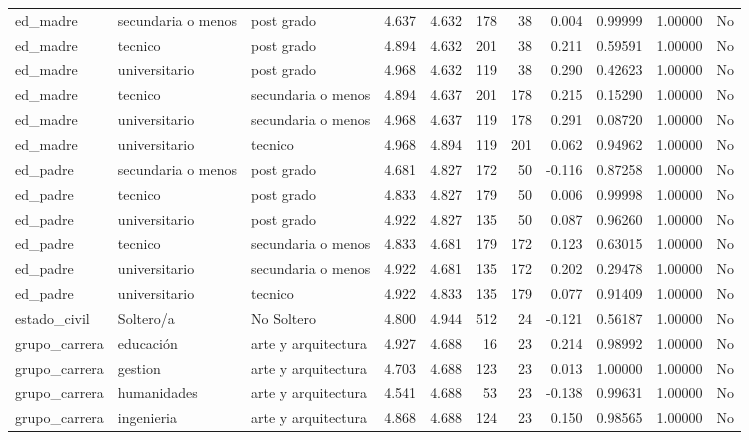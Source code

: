\documentclass[
  letterpaper,
  DIV=11,
  numbers=noendperiod]{scrartcl}
\begin{document}
\begin{table}
\begin{tabular*}{\linewidth}{@{\extracolsep{\fill}}lllrrrrrrrl}
\midrule\addlinespace[2.5pt]
\multicolumn{11}{l}{soporte\_social} \\[2.5pt] 
\midrule\addlinespace[2.5pt]
ed\_madre & secundaria o menos & post grado & 4.637 & 4.632 & 178 & 38 & 0.004 & 0.99999 & 1.00000 & No \\ 
ed\_madre & tecnico & post grado & 4.894 & 4.632 & 201 & 38 & 0.211 & 0.59591 & 1.00000 & No \\ 
ed\_madre & universitario & post grado & 4.968 & 4.632 & 119 & 38 & 0.290 & 0.42623 & 1.00000 & No \\ 
ed\_madre & tecnico & secundaria o menos & 4.894 & 4.637 & 201 & 178 & 0.215 & 0.15290 & 1.00000 & No \\ 
ed\_madre & universitario & secundaria o menos & 4.968 & 4.637 & 119 & 178 & 0.291 & 0.08720 & 1.00000 & No \\ 
ed\_madre & universitario & tecnico & 4.968 & 4.894 & 119 & 201 & 0.062 & 0.94962 & 1.00000 & No \\ 
ed\_padre & secundaria o menos & post grado & 4.681 & 4.827 & 172 & 50 & -0.116 & 0.87258 & 1.00000 & No \\ 
ed\_padre & tecnico & post grado & 4.833 & 4.827 & 179 & 50 & 0.006 & 0.99998 & 1.00000 & No \\ 
ed\_padre & universitario & post grado & 4.922 & 4.827 & 135 & 50 & 0.087 & 0.96260 & 1.00000 & No \\ 
ed\_padre & tecnico & secundaria o menos & 4.833 & 4.681 & 179 & 172 & 0.123 & 0.63015 & 1.00000 & No \\ 
ed\_padre & universitario & secundaria o menos & 4.922 & 4.681 & 135 & 172 & 0.202 & 0.29478 & 1.00000 & No \\ 
ed\_padre & universitario & tecnico & 4.922 & 4.833 & 135 & 179 & 0.077 & 0.91409 & 1.00000 & No \\ 
estado\_civil & Soltero/a & No Soltero & 4.800 & 4.944 & 512 & 24 & -0.121 & 0.56187 & 1.00000 & No \\ 
grupo\_carrera & educación & arte y arquitectura & 4.927 & 4.688 & 16 & 23 & 0.214 & 0.98992 & 1.00000 & No \\ 
grupo\_carrera & gestion & arte y arquitectura & 4.703 & 4.688 & 123 & 23 & 0.013 & 1.00000 & 1.00000 & No \\ 
grupo\_carrera & humanidades & arte y arquitectura & 4.541 & 4.688 & 53 & 23 & -0.138 & 0.99631 & 1.00000 & No \\ 
grupo\_carrera & ingenieria & arte y arquitectura & 4.868 & 4.688 & 124 & 23 & 0.150 & 0.98565 & 1.00000 & No \\ 

\end{tabular*}
\end{table}
\end{document}
